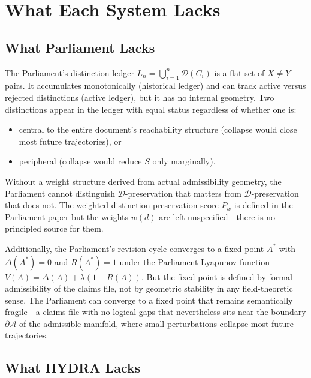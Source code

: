 \documentclass[12pt, a4paper]{article}
\theoremstyle{plain}
\theoremstyle{definition}
\theoremstyle{remark}
\begin{document}
\section{What Each System Lacks}
\label{sec:gap}

\subsection{What Parliament Lacks}

The Parliament's distinction ledger $L_n = \bigcup_{i=1}^n \mathcal{D}(C_i)$ is a flat set of
$X \neq Y$ pairs. It accumulates monotonically (historical ledger) and can
track active versus rejected distinctions (active ledger), but it has no internal
geometry. Two distinctions appear in the ledger with equal status regardless of
whether one is:
\begin{itemize}
\item central to the entire document's reachability structure (collapse would close most future trajectories), or
\item peripheral (collapse would reduce $S$ only marginally).
\end{itemize}

Without a weight structure derived from actual admissibility geometry, the
Parliament cannot distinguish $\mathcal{D}$-preservation that matters from
$\mathcal{D}$-preservation that does not. The weighted distinction-preservation score
$P_w$ is defined in the Parliament paper but the weights $w(d)$ are left
unspecified---there is no principled source for them.

Additionally, the Parliament's revision cycle converges to a fixed point $A^*$
with $\Delta(A^*) = 0$ and $R(A^*) = 1$ under the Parliament Lyapunov function
$V(A) = \Delta(A) + \lambda(1 - R(A))$. But the fixed point is defined by formal
admissibility of the claims file, not by geometric stability in any field-theoretic
sense. The Parliament can converge to a fixed point that remains semantically
fragile---a claims file with no logical gaps that nevertheless sits near the
boundary $\partial\mathcal{A}$ of the admissible manifold, where small perturbations
collapse most future trajectories.

\subsection{What HYDRA Lacks}
\end{document}

